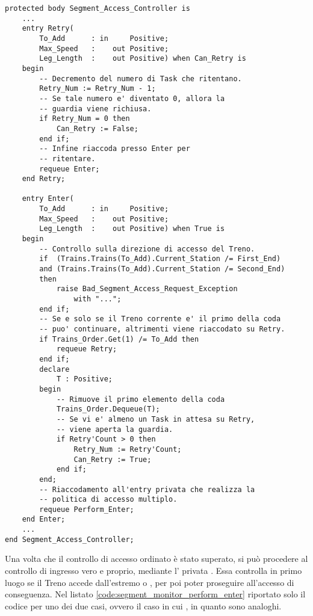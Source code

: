 \begin{lstlisting}[caption=\small{Meccanismo che garantisce accesso ordinato secondo l'ordine sancito da \ttt{Trains\_Order}.},label=code:impl_segment_monitor_enter]
protected body Segment_Access_Controller is
	...
	entry Retry(
		To_Add      : in     Positive;
		Max_Speed   :    out Positive;
		Leg_Length  :    out Positive) when Can_Retry is
	begin
		-- Decremento del numero di Task che ritentano.
		Retry_Num := Retry_Num - 1;
		-- Se tale numero e' diventato 0, allora la 
		-- guardia viene richiusa.
		if Retry_Num = 0 then
			Can_Retry := False;
		end if;
		-- Infine riaccoda presso Enter per 
		-- ritentare.
		requeue Enter;
	end Retry;
	
	entry Enter(
		To_Add      : in     Positive;
		Max_Speed   : 	 out Positive;
		Leg_Length  :    out Positive) when True is
	begin
		-- Controllo sulla direzione di accesso del Treno.
		if  (Trains.Trains(To_Add).Current_Station /= First_End) 
		and (Trains.Trains(To_Add).Current_Station /= Second_End) 
		then
			raise Bad_Segment_Access_Request_Exception 
				with "...";
		end if;
		-- Se e solo se il Treno corrente e' il primo della coda 
		-- puo' continuare, altrimenti viene riaccodato su Retry.
		if Trains_Order.Get(1) /= To_Add then
			requeue Retry;
		end if;
		declare
			T : Positive;
		begin
			-- Rimuove il primo elemento della coda
			Trains_Order.Dequeue(T);
			-- Se vi e' almeno un Task in attesa su Retry,
			-- viene aperta la guardia.
			if Retry'Count > 0 then
				Retry_Num := Retry'Count;
				Can_Retry := True;
			end if;
		end;
		-- Riaccodamento all'entry privata che realizza la
		-- politica di accesso multiplo.
		requeue Perform_Enter;
	end Enter;
	...
end Segment_Access_Controller;
\end{lstlisting}

Una volta che il controllo di accesso ordinato è stato superato, si può procedere al controllo di ingresso vero e proprio, mediante l' privata . Essa controlla in primo luogo se il Treno accede dall'estremo  o , per poi poter proseguire all'accesso di conseguenza. Nel listato \ref{code:segment_monitor_perform_enter} riportato solo il codice per uno dei due casi, ovvero il caso in cui , in quanto sono analoghi. 

